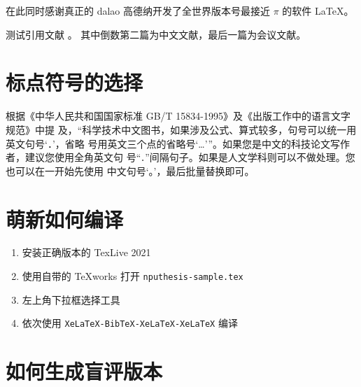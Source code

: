 \documentclass[lang=chs, degree=phd, blindreview=false, winfonts=true]{nputhesis}
\begin{document}
在此同时感谢真正的 dalao 高德纳开发了全世界版本号最接近 $\pi$ 的软件
\LaTeX \cite{knuth1986the}\nocite{lamport1989latex}。

测试引用文献 \cite{szegedy2015going, shen2021peridynamic, chen2014maiyuan, chen2018autonomous}。
其中倒数第二篇为中文文献，最后一篇为会议文献。

\section{标点符号的选择}

根据《中华人民共和国国家标准 GB/T 15834-1995》及《出版工作中的语言文字规范》中提
及，“科学技术中文图书，如果涉及公式、算式较多，句号可以统一用英文句号‘．’，省略
号用英文三个点的省略号‘…’”。如果您是中文的科技论文写作者，建议您使用全角英文句
号“\lstinline`．`”间隔句子。如果是人文学科则可以不做处理。您也可以在一开始先使用
中文句号‘。’，最后批量替换即可。

\section{萌新如何编译}

\begin{enumerate}
    \setlength{\itemsep}{0pt}
    \item 安装正确版本的 TexLive 2021
    \item 使用自带的 TeXworks 打开 \lstinline`nputhesis-sample.tex`
    \item 左上角下拉框选择工具
    \item 依次使用 \lstinline`XeLaTeX-BibTeX-XeLaTeX-XeLaTeX` 编译
\end{enumerate}

\section{如何生成盲评版本}
\end{document}
